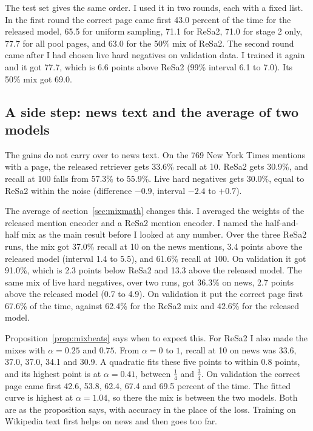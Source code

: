 \documentclass[11pt]{article}
\theoremstyle{definition}
\begin{document}
The test set gives the same order. I used it in two rounds, each with a fixed list. In the first round the correct page came first 43.0 percent of the time for the released model, 65.5 for uniform sampling, 71.1 for ReSa2, 71.0 for stage 2 only, 77.7 for all pool pages, and 63.0 for the 50\% mix of ReSa2. The second round came after I had chosen live hard negatives on validation data. I trained it again and it got 77.7, which is 6.6 points above ReSa2 (99\% interval 6.1 to 7.0). Its 50\% mix got 69.0.

\subsection{A side step: news text and the average of two models}
\label{sec:news}

The gains do not carry over to news text. On the 769 New York Times mentions with a page, the released retriever gets 33.6\% recall at 10. ReSa2 gets 30.9\%, and recall at 100 falls from 57.3\% to 55.9\%. Live hard negatives gets 30.0\%, equal to ReSa2 within the noise (difference $-0.9$, interval $-2.4$ to $+0.7$).

The average of section~\ref{sec:mixmath} changes this. I averaged the weights of the released mention encoder and a ReSa2 mention encoder. I named the half-and-half mix as the main result before I looked at any number. Over the three ReSa2 runs, the mix got 37.0\% recall at 10 on the news mentions, 3.4 points above the released model (interval 1.4 to 5.5), and 61.6\% recall at 100. On validation it got 91.0\%, which is 2.3 points below ReSa2 and 13.3 above the released model. The same mix of live hard negatives, over two runs, got 36.3\% on news, 2.7 points above the released model (0.7 to 4.9). On validation it put the correct page first 67.6\% of the time, against 62.4\% for the ReSa2 mix and 42.6\% for the released model.

Proposition~\ref{prop:mixbeats} says when to expect this. For ReSa2 I also made the mixes with $\alpha = 0.25$ and $0.75$. From $\alpha = 0$ to $1$, recall at 10 on news was 33.6, 37.0, 37.0, 34.1 and 30.9. A quadratic fits these five points to within 0.8 points, and its highest point is at $\alpha = 0.41$, between $\tfrac14$ and $\tfrac34$. On validation the correct page came first 42.6, 53.8, 62.4, 67.4 and 69.5 percent of the time. The fitted curve is highest at $\alpha = 1.04$, so there the mix is between the two models. Both are as the proposition says, with accuracy in the place of the loss. Training on Wikipedia text first helps on news and then goes too far.
\end{document}
